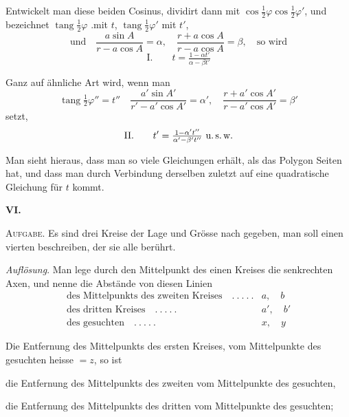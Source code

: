 %
\par
Entwickelt man diese beiden Cosinus, dividirt dann mit \(\cos\tfrac12\varphi\cos\tfrac12\varphi'\), und bezeichnet \(\operatorname{tang}\tfrac12\varphi\) .mit \(t\), \(\operatorname{tang}\tfrac12\varphi'\) mit \(t'\),
\[
\text{und}\quad\frac{a\sin A}{r-a\cos A}=\alpha,\quad\frac{r+a\cos A}{r-a\cos A}=\beta,\quad\text{so wird}
\]
\[
\text{I.}\qquad t=\tfrac{1-\alpha t'}{\alpha-\beta t'}
\]
\par
Ganz auf ähnliche Art wird, wenn man
\[
\operatorname{tang}\tfrac12\varphi''=t''\quad\frac{a'\sin A'}{r'-a'\cos A'}=\alpha',\quad\frac{r+a'\cos A'}{r-a'\cos A'}=\beta'
\]
setzt,
\[
\text{II.}\qquad t'=\tfrac{1-\alpha't''}{\alpha'-\beta't''}\ \text{u.\,s.\,w.}
\]
\par
Man sieht hieraus, dass man so viele Gleichungen erhält, als das Polygon Seiten hat, und dass man durch Verbindung derselben zuletzt auf eine quadratische Gleichung für \(t\) kommt.
\par\medskip{}
\centerline{\textbf{VI.}}\nobreak\smallskip
\textsc{Aufgabe}. Es sind drei Kreise der Lage und Grösse nach gegeben, man soll einen vierten beschreiben, der sie alle berührt.

\textit{Auflösung}. Man lege durch den Mittelpunkt des einen Kreises die senkrechten Axen, und nenne die Abstände von diesen Linien
\[
\begin{array}{rl}
\text{des Mittelpunkts des zweiten Kreises}\quad .\ .\ .\ .\ .&a,\quad b\\
\text{des dritten Kreises}\quad .\ .\ .\ .\ .&a',\quad b'\\
\text{des gesuchten}\quad .\ .\ .\ .\ .&x,\quad y
\end{array}
\]
\par
Die Entfernung des Mittelpunkts des ersten Kreises, vom Mittelpunkte des gesuchten heisse \(=z\), so ist
\begin{list}{}{\setlength{\leftmargin}{3em}\setlength{\labelwidth}{2.5em}\setlength{\labelsep}{.5em}}
\item[\(z-c\)] die Entfernung des Mittelpunkts des zweiten vom Mittelpunkte des gesuchten,
\item[\(z-c'\)] die Entfernung des Mittelpunkts des dritten vom Mittelpunkte des gesuchten;
\end{list}
